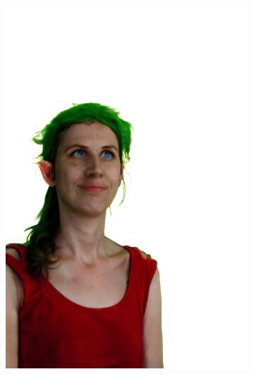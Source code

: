 \begin{figure}[ht]
\begin{subfigure}{0.08\linewidth}
        \includegraphics[width=\textwidth]{Figures/results/low/dora_elf/11_render.png}

\end{subfigure}
\end{figure}
